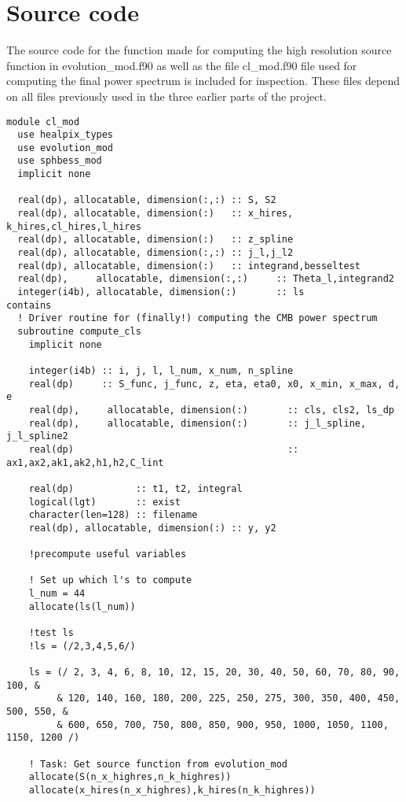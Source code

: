 \documentclass[a4paper]{report}
\begin{document}
\section{Source code}\label{sec:files}
The source code for the function made for computing the high resolution source function in evolution\_mod.f90 as well as the file cl\_mod.f90 file used for computing the final power spectrum is included for inspection. These files depend on all files previously used in the three earlier parts of the project.
\begin{verbatim}
module cl_mod
  use healpix_types
  use evolution_mod
  use sphbess_mod
  implicit none

  real(dp), allocatable, dimension(:,:) :: S, S2
  real(dp), allocatable, dimension(:)   :: x_hires, k_hires,cl_hires,l_hires
  real(dp), allocatable, dimension(:)   :: z_spline
  real(dp), allocatable, dimension(:,:) :: j_l,j_l2
  real(dp), allocatable, dimension(:)   :: integrand,besseltest
  real(dp),     allocatable, dimension(:,:)     :: Theta_l,integrand2
  integer(i4b), allocatable, dimension(:)       :: ls
contains
  ! Driver routine for (finally!) computing the CMB power spectrum
  subroutine compute_cls
    implicit none

    integer(i4b) :: i, j, l, l_num, x_num, n_spline
    real(dp)     :: S_func, j_func, z, eta, eta0, x0, x_min, x_max, d, e
    real(dp),     allocatable, dimension(:)       :: cls, cls2, ls_dp
    real(dp),     allocatable, dimension(:)       :: j_l_spline, j_l_spline2
    real(dp)                                      :: ax1,ax2,ak1,ak2,h1,h2,C_lint

    real(dp)           :: t1, t2, integral
    logical(lgt)       :: exist
    character(len=128) :: filename
    real(dp), allocatable, dimension(:) :: y, y2

    !precompute useful variables

    ! Set up which l's to compute
    l_num = 44
    allocate(ls(l_num))

    !test ls
    !ls = (/2,3,4,5,6/)
    
    ls = (/ 2, 3, 4, 6, 8, 10, 12, 15, 20, 30, 40, 50, 60, 70, 80, 90, 100, &
         & 120, 140, 160, 180, 200, 225, 250, 275, 300, 350, 400, 450, 500, 550, &
         & 600, 650, 700, 750, 800, 850, 900, 950, 1000, 1050, 1100, 1150, 1200 /)

    ! Task: Get source function from evolution_mod
    allocate(S(n_x_highres,n_k_highres))
    allocate(x_hires(n_x_highres),k_hires(n_k_highres))



\end{verbatim}
\end{document}
